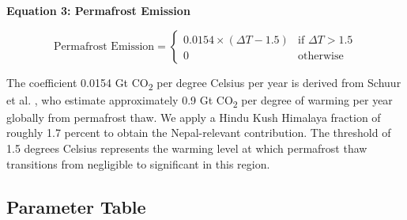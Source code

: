 \documentclass[12pt, a4paper]{article}
\begin{document}
\textbf{Equation 3: Permafrost Emission}

\[
\text{Permafrost Emission} = \begin{cases} 0.0154 \times (\Delta T - 1.5) & \text{if } \Delta T > 1.5 \\ 0 & \text{otherwise} \end{cases}
\]

The coefficient 0.0154 Gt CO\textsubscript{2} per degree Celsius per year is derived from Schuur et al. \cite{schuur2015}, who estimate approximately 0.9 Gt CO\textsubscript{2} per degree of warming per year globally from permafrost thaw. We apply a Hindu Kush Himalaya fraction of roughly 1.7 percent to obtain the Nepal-relevant contribution. The threshold of 1.5 degrees Celsius represents the warming level at which permafrost thaw transitions from negligible to significant in this region.

\subsection{Parameter Table}
\end{document}

